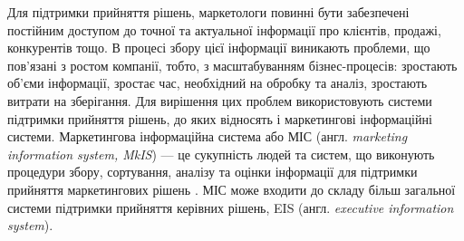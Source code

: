 Для підтримки прийняття рішень, маркетологи повинні бути забезпечені постійним доступом до точної та актуальної інформації про клієнтів, продажі, конкурентів тощо. В процесі збору цієї інформації виникають проблеми, що пов’язані з ростом компанії, тобто, з масштабуванням бізнес-процесів: зростають об’єми інформації, зростає час, необхідний на обробку та аналіз, зростають витрати на зберігання. Для вирішення цих проблем використовують системи підтримки прийняття рішень, до яких відносять і маркетингові інформаційні системи. Маркетингова інформаційна система або МІС (англ. {\it marketing information system, MkIS}) --- це сукупність людей та систем, що виконують процедури збору, сортування, аналізу та оцінки інформації для підтримки прийняття маркетингових рішень \cite{kotler14}. МІС може входити до складу більш загальної системи підтримки прийняття керівних рішень, EIS (англ. {\it executive information system}).
%    
%    
%

